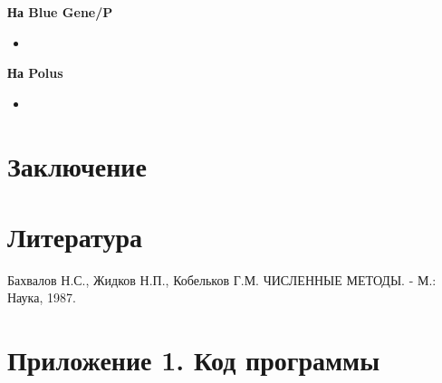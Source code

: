 \documentclass[12pt, fleqn]{article}
\theoremstyle{definition}
\begin{document}
\textbf{На Blue Gene/P}
\begin{itemize}
    \setlength{\itemsep}{1pt}
  \setlength{\parskip}{0pt}
  \setlength{\parsep}{0pt}
 \item 
\end{itemize}



\textbf{На Polus}
\begin{itemize}
    \setlength{\itemsep}{1pt}
  \setlength{\parskip}{0pt}
  \setlength{\parsep}{0pt}
 \item 
\end{itemize}



\section{Заключение}

\newpage
\section{Литература}
\begin{thebibliography}{}
 Бахвалов Н.С., Жидков Н.П., Кобельков Г.М. ЧИСЛЕННЫЕ МЕТОДЫ. - М.: Наука, 1987.
 
\end{thebibliography}
\newpage
\section{Приложение 1. Код программы}\label{sec:code}
{}
\end{document}
